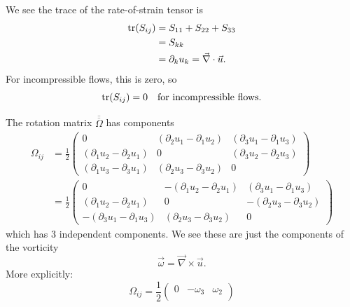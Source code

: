 \begin{remark}
We see the trace of the rate-of-strain tensor is
\begin{subequations}
  \begin{align}
    \operatorname{tr}(S_{ij}) &= S_{11}+S_{22}+S_{33}\\
    &= S_{kk}\\
&= \partial_{k}u_{k} = \vec{\nabla}\cdot\vec{u}.
  \end{align}
\end{subequations}
For incompressible flows, this is zero, so
\begin{equation}
\operatorname{tr}(S_{ij})=0\quad\mbox{for incompressible flows}.
\end{equation}
\end{remark}

\begin{node}
The rotation matrix $\overline{\overline{\Omega}}$ has components
\begin{subequations}
  \begin{align}
\Omega_{ij}&=\frac{1}{2}\begin{pmatrix}
0 & (\partial_{2}u_{1}-\partial_{1}u_{2}) & (\partial_{3}u_{1}-\partial_{1}u_{3})\\
(\partial_{1}u_{2}-\partial_{2}u_{1}) & 0 & (\partial_{3}u_{2}-\partial_{2}u_{3})\\
(\partial_{1}u_{3}-\partial_{3}u_{1}) & (\partial_{2}u_{3}-\partial_{3}u_{2}) & 0
\end{pmatrix}\\
&=\frac{1}{2}\begin{pmatrix}
0 & -(\partial_{1}u_{2}-\partial_{2}u_{1}) & (\partial_{3}u_{1}-\partial_{1}u_{3})\\
(\partial_{1}u_{2}-\partial_{2}u_{1}) & 0 & -(\partial_{2}u_{3}-\partial_{3}u_{2})\\
-(\partial_{3}u_{1}-\partial_{1}u_{3}) & (\partial_{2}u_{3}-\partial_{3}u_{2}) & 0
\end{pmatrix}
  \end{align}
\end{subequations}
which has 3 independent components. We see these are just the
components of the vorticity
\begin{equation}
\vec{\omega}=\vec{\nabla}\times\vec{u}.
\end{equation}
More explicitly:
\begin{equation}
\Omega_{ij} = \frac{1}{2}\begin{pmatrix}0 & -\omega_{3} & \omega_{2} \\

\end{pmatrix}
\end{equation}
\end{node}
